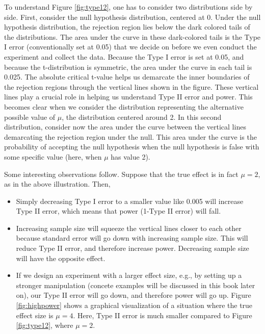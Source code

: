 \documentclass[12pt,]{krantz}
\providecommand{\tightlist}{%
  \setlength{\itemsep}{0pt}\setlength{\parskip}{0pt}}
\begin{document}
To understand Figure \ref{fig:type12}, one has to consider two distributions side by side. First, consider the null hypothesis distribution, centered at 0. Under the null hypothesis distribution, the rejection region lies below the dark colored tails of the distributions. The area under the curve in these dark-colored tails is the Type I error (conventionally set at 0.05) that we decide on before we even conduct the experiment and collect the data. Because the Type I error is set at 0.05, and because the t-distribution is symmetric, the area under the curve in each tail is 0.025. The absolute critical t-value helps us demarcate the inner boundaries of the rejection regions through the vertical lines shown in the figure. These vertical lines play a crucial role in helping us understand Type II error and power. This becomes clear when we consider the distribution representing the alternative possible value of \(\mu\), the distribution centered around 2. In this second distribution, consider now the area under the curve between the vertical lines demarcating the rejection region under the null. This area under the curve is the probability of accepting the null hypothesis when the null hypothesis is false with some specific value (here, when \(\mu\) has value 2).

Some interesting observations follow. Suppose that the true effect is in fact \(\mu=2\), as in the above illustration. Then,

\begin{itemize}
\tightlist
\item
  Simply decreasing Type I error to a smaller value like 0.005 will increase Type II error, which means that power (1-Type II error) will fall.
\item
  Increasing sample size will squeeze the vertical lines closer to each other because standard error will go down with increasing sample size. This will reduce Type II error, and therefore increase power. Decreasing sample size will have the opposite effect.
\item
  If we design an experiment with a larger effect size, e.g., by setting up a stronger manipulation (concete examples will be discussed in this book later on), our Type II error will go down, and therefore power will go up. Figure \ref{fig:highpower} shows a graphical visualization of a situation where the true effect size is \(\mu=4\). Here, Type II error is much smaller compared to Figure \ref{fig:type12}, where \(\mu=2\).
\end{itemize}
\end{document}
